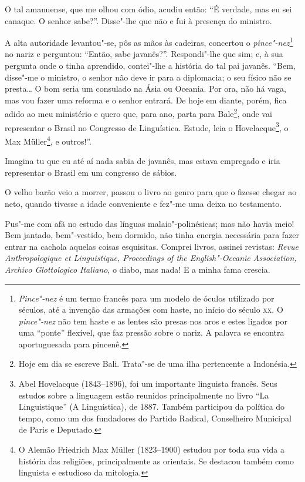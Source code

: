 O tal amanuense, que me olhou com ódio, acudiu então: ``É verdade, mas
eu sei canaque. O senhor sabe?''. Disse"-lhe que não e fui à presença do
ministro.

A alta autoridade levantou"-se, pôs as mãos às cadeiras, concertou o
\emph{pince"-nez}\footnote{\emph{Pince"-nez} é um termo francês para um
  modelo de óculos utilizado por séculos, até a invenção das armações
  com haste, no início do século \textsc{xx}. O \emph{pince"-nez} não tem haste e
  as lentes são presas nos aros e estes ligados por uma ``ponte''
  flexível, que faz pressão sobre o nariz. A palavra se encontra
  aportuguesada para pincenê.} no nariz e perguntou: ``Então, sabe
javanês?''. Respondi"-lhe que sim; e, à sua pergunta onde o tinha
aprendido, contei"-lhe a história do tal pai javanês. ``Bem, disse"-me o
ministro, o senhor não deve ir para a diplomacia; o seu físico não se
presta\ldots{} O bom seria um consulado na Ásia ou Oceania. Por ora, não há
vaga, mas vou fazer uma reforma e o senhor entrará. De hoje em diante,
porém, fica adido ao meu ministério e quero que, para ano, parta para
Bale\footnote{Hoje em dia se escreve Bali. Trata"-se de uma ilha
  pertencente a Indonésia.}, onde vai representar o Brasil no Congresso
de Linguística. Estude, leia o Hovelacque\footnote{Abel Hovelacque (1843--1896), foi um importante linguista francês. Seus estudos sobre a
  linguagem estão reunidos principalmente no livro ``La Linguistique''
  (A Linguística), de 1887. Também participou da política do tempo, como
  um dos fundadores do Partido Radical, Conselheiro Municipal de Paris e
  Deputado.}, o Max Müller\footnote{O Alemão Friedrich Max Müller (1823--1900) estudou por toda sua vida a história das religiões,
  principalmente as orientais. Se destacou também como linguista e
  estudioso da mitologia.}, e outros!''.

Imagina tu que eu até aí nada sabia de javanês, mas estava empregado e
iria representar o Brasil em um congresso de sábios.

O velho barão veio a morrer, passou o livro ao genro para que o fizesse
chegar ao neto, quando tivesse a idade conveniente e fez"-me uma deixa no
testamento.

Pus"-me com afã no estudo das línguas malaio"-polinésicas; mas não havia
meio! Bem jantado, bem"-vestido, bem dormido, não tinha energia
necessária para fazer entrar na cachola aquelas coisas esquisitas.
Comprei livros, assinei revistas: \emph{Revue Anthropologique et
Linguistique, Proceedings of the English"-Oceanic Association, Archivo
Glottologico Italiano}, o diabo, mas nada! E a minha fama crescia.

